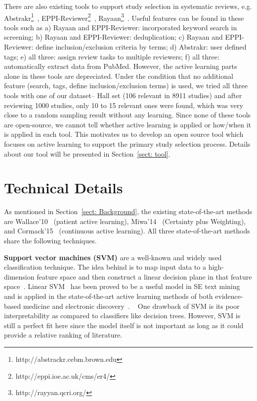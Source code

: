 \documentclass{svjour3}
\theoremstyle{break}
\newcommand{\respto}[1]{
\fcolorbox{black}{black!15}{
\label{response:#1}
\bf
  \scriptsize R-{#1}}~
}
\begin{document}
There are also existing tools to support study selection in systematic reviews, e.g. Abstrakr\footnote{http://abstrackr.cebm.brown.edu}~\cite{wallace2012deploying}, EPPI-Reviewer\footnote{http://eppi.ioe.ac.uk/cms/er4/}~\cite{thomas2010eppi}, Rayaan\footnote{http://rayyan.qcri.org/}~\cite{Ouzzani2016}. Useful features can be found in these tools such as a) Rayaan and EPPI-Reviewer: incorporated keyword search in screening; b) Rayaan and EPPI-Reviewer: deduplication; c) Rayaan and EPPI-Reviewer: define inclusion/exclusion criteria by terms; d) Abstrakr: user defined tags; e) all three: assign review tasks to multiple reviewers; f) all three: automatically extract data from PubMed. However, the active learning parts alone in these tools are depreciated. Under the condition that no additional feature (search, tags, define inclusion/exclusion terms) is used, we tried all three tools with one of our dataset-- Hall set (106 relevant in 8911 studies) and after reviewing 1000 studies, only 10 to 15 relevant ones were found, which was very close to a random sampling result without any learning. Since none of these tools are open-source, we cannot tell whether active learning is applied or how/when it is applied in each tool. This motivates us to develop an open source tool which focuses on active learning to support the primary study selection process. Details about our tool will be presented in Section~\ref{sect: tool}.



\section{Technical Details}
\label{sect: Methods}

As mentioned in Section~\ref{sect: Background}, the existing state-of-the-art methods are Wallace'10~\cite{wallace2010semi} (patient active learning), Miwa'14~\cite{miwa2014reducing} (Certainty plus Weighting), and Cormack'15~\cite{cormack2015autonomy} (continuous active learning). All three state-of-the-art methods share the following techniques.

\textbf{Support vector machines (SVM)} are a well-known and widely used classification technique. The idea behind is to map input data to a high-dimension feature space and then construct a linear decision plane in that feature space~\cite{cortes1995support}. Linear SVM~\cite{joachims2006training} has been proved to be a useful model in SE text mining~\cite{krishna2016bigse} and is applied in the state-of-the-art active learning methods of both evidence-based medicine and electronic discovery~\cite{miwa2014reducing,wallace2010semi,cormack2014evaluation}. \respto{1h}One drawback of SVM is its poor interpretability as compared to classifiers like decision trees. However, SVM is still a perfect fit here since the model itself is not important as long as it could provide a relative ranking of literature.
\end{document}
